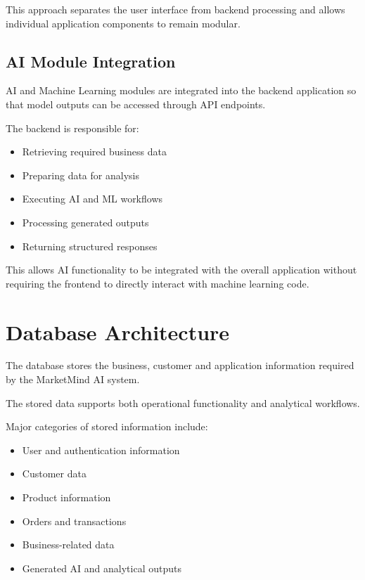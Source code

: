 \documentclass[12pt,a4paper]{report}
\begin{document}
This approach separates the user interface from backend processing and
allows individual application components to remain modular.


\subsection{AI Module Integration}

AI and Machine Learning modules are integrated into the backend
application so that model outputs can be accessed through API endpoints.

The backend is responsible for:

\begin{itemize}
    \item Retrieving required business data
    \item Preparing data for analysis
    \item Executing AI and ML workflows
    \item Processing generated outputs
    \item Returning structured responses
\end{itemize}

This allows AI functionality to be integrated with the overall
application without requiring the frontend to directly interact with
machine learning code.



\section{Database Architecture}

The database stores the business, customer and application information
required by the MarketMind AI system.

The stored data supports both operational functionality and analytical
workflows.

Major categories of stored information include:

\begin{itemize}
    \item User and authentication information
    \item Customer data
    \item Product information
    \item Orders and transactions
    \item Business-related data
    \item Generated AI and analytical outputs
\end{itemize}
\end{document}
